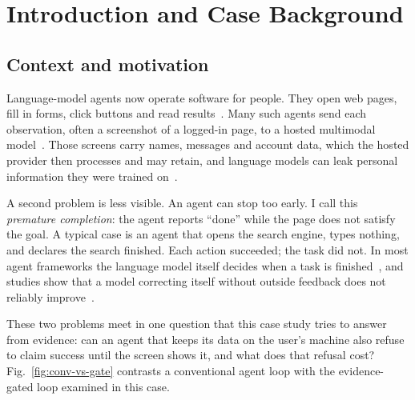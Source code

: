 \chapter{Introduction and Case Background}
\label{ch:intro}

\section{Context and motivation}

Language-model agents now operate software for people. They open web pages, fill in forms, click buttons and read results~\cite{zhou2024webarena,he2024webvoyager,xie2024osworld}. Many such agents send each observation, often a screenshot of a logged-in page, to a hosted multimodal model~\cite{he2024webvoyager,zheng2024seeact,zhang2025ufo}. Those screens carry names, messages and account data, which the hosted provider then processes and may retain, and language models can leak personal information they were trained on~\cite{lukas2023pii}.

A second problem is less visible. An agent can stop too early. I call this \emph{premature completion}: the agent reports ``done'' while the page does not satisfy the goal. A typical case is an agent that opens the search engine, types nothing, and declares the search finished. Each action succeeded; the task did not. In most agent frameworks the language model itself decides when a task is finished~\cite{yao2023react,shinn2023reflexion}, and studies show that a model correcting itself without outside feedback does not reliably improve~\cite{huang2024cannot}.

These two problems meet in one question that this case study tries to answer from evidence: can an agent that keeps its data on the user's machine also refuse to claim success until the screen shows it, and what does that refusal cost? Fig.~\ref{fig:conv-vs-gate} contrasts a conventional agent loop with the evidence-gated loop examined in this case.

